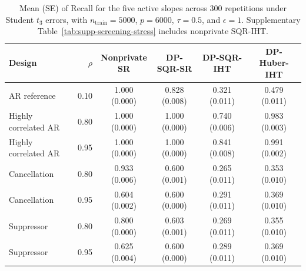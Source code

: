 \begin{table}[!tb]
\centering\small
\setlength{\tabcolsep}{3pt}
\caption{Mean (SE) of Recall for the five active slopes across 300
repetitions under Student $t_3$ errors, with $n_{\mathrm{train}}=5000$,
$p=6000$, $\tau=0.5$, and $\epsilon=1$.
Supplementary Table~\ref{tab:supp-screening-stress} includes nonprivate SQR-IHT.}
\label{tab:screening-stress}
\begin{tabular}{@{}lrcccc@{}}
\toprule
Design & $\rho$ & \shortstack{Nonprivate\\SR} & DP-SQR-SR & DP-SQR-IHT & DP-Huber-IHT\\
\midrule
AR reference & 0.10 & 1.000 (0.000) & 0.828 (0.008) & 0.321 (0.011) & 0.479 (0.011) \\
Highly correlated AR & 0.80 & 1.000 (0.000) & 1.000 (0.000) & 0.740 (0.006) & 0.983 (0.003) \\
Highly correlated AR & 0.95 & 1.000 (0.000) & 1.000 (0.000) & 0.841 (0.008) & 0.991 (0.002) \\
Cancellation & 0.80 & 0.933 (0.006) & 0.600 (0.001) & 0.265 (0.011) & 0.353 (0.010) \\
Cancellation & 0.95 & 0.604 (0.002) & 0.600 (0.000) & 0.291 (0.011) & 0.369 (0.010) \\
Suppressor & 0.80 & 0.800 (0.000) & 0.603 (0.001) & 0.269 (0.011) & 0.355 (0.010) \\
Suppressor & 0.95 & 0.625 (0.004) & 0.600 (0.000) & 0.289 (0.011) & 0.369 (0.010) \\
\bottomrule
\end{tabular}
\end{table}
